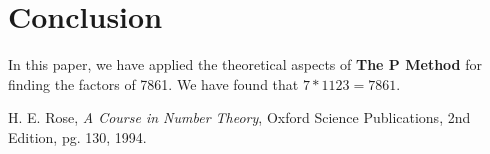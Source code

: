 \documentclass[12pt]{article}
\theoremstyle{definition}
\begin{document}
\section{Conclusion}
In this paper, we have applied the theoretical aspects of \textbf{The P Method} for finding the factors of 7861. We have found that $7 * 1123 = 7861$.

\begin{thebibliography}{99}

 H. E. Rose, \emph{A Course in Number Theory}, Oxford Science Publications, 2nd Edition, pg. 130, 1994.


\end{thebibliography}
\end{document}
